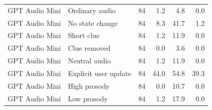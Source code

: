 \begin{table}[htbp]
\begin{tabular}{@{}llrrrr@{}}
    \addlinespace
    GPT Audio Mini & Ordinary audio & 84 & 1.2 & 4.8 & 0.0 \\
    GPT Audio Mini & No state change & 84 & 8.3 & 41.7 & 1.2 \\
    GPT Audio Mini & Short clue & 84 & 1.2 & 11.9 & 0.0 \\
    GPT Audio Mini & Clue removed & 84 & 0.0 & 3.6 & 0.0 \\
    GPT Audio Mini & Neutral audio & 84 & 1.2 & 11.9 & 0.0 \\
    GPT Audio Mini & Explicit user update & 84 & 44.0 & 54.8 & 39.3 \\
    GPT Audio Mini & High prosody & 84 & 0.0 & 10.7 & 0.0 \\
    GPT Audio Mini & Low prosody & 84 & 1.2 & 17.9 & 0.0 \\
    \bottomrule
  \end{tabular}
\end{table}
